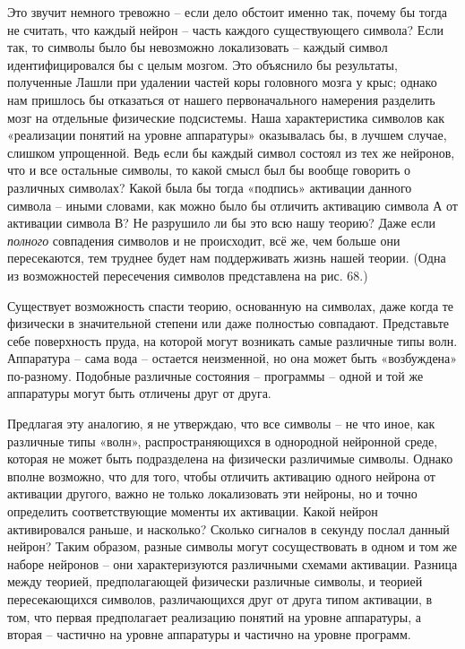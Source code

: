 \documentclass[../main.tex]{subfiles}
\begin{document}
Это звучит немного тревожно \--- если дело обстоит именно так, почему бы тогда не считать, что каждый нейрон \--- часть каждого существующего символа? Если так, то символы было бы невозможно локализовать \--- каждый символ идентифицировался бы с целым мозгом. Это объяснило бы результаты, полученные Лашли при удалении частей коры головного мозга у крыс; однако нам пришлось бы отказаться от нашего первоначального намерения разделить мозг на отдельные физические подсистемы. Наша характеристика символов как «реализации понятий на уровне аппаратуры» оказывалась бы, в лучшем случае, слишком упрощенной. Ведь если бы каждый символ состоял из тех же нейронов, что и все остальные символы, то какой смысл был бы вообще говорить о различных символах? Какой была бы тогда «подпись» активации данного символа \--- иными словами, как можно было бы отличить активацию символа А от активации символа В? Не разрушило ли бы это всю нашу теорию? Даже если \emph{полного} совпадения символов и не происходит, всё же, чем больше они пересекаются, тем труднее будет нам поддерживать жизнь нашей теории. (Одна из возможностей пересечения символов представлена на рис. 68.)

Существует возможность спасти теорию, основанную на символах, даже когда те физически в значительной степени или даже полностью совпадают. Представьте себе поверхность пруда, на которой могут возникать самые различные типы волн. Аппаратура \--- сама вода \--- остается неизменной, но она может быть «возбуждена» по-разному. Подобные различные состояния \--- программы \--- одной и той же аппаратуры могут быть отличены друг от друга.

Предлагая эту аналогию, я не утверждаю, что все символы \--- не что иное, как различные типы «волн», распространяющихся в однородной нейронной среде, которая не может быть подразделена на физически различимые символы. Однако вполне возможно, что для того, чтобы отличить активацию одного нейрона от активации другого, важно не только локализовать эти нейроны, но и точно определить соответствующие моменты их активации. Какой нейрон активировался раньше, и насколько? Сколько сигналов в секунду послал данный нейрон? Таким образом, разные символы могут сосуществовать в одном и том же наборе нейронов \--- они характеризуются различными схемами активации. Разница между теорией, предполагающей физически различные символы, и теорией пересекающихся символов, различающихся друг от друга типом активации, в том, что первая предполагает реализацию понятий на уровне аппаратуры, а вторая \--- частично на уровне аппаратуры и частично на уровне программ.
\end{document}
